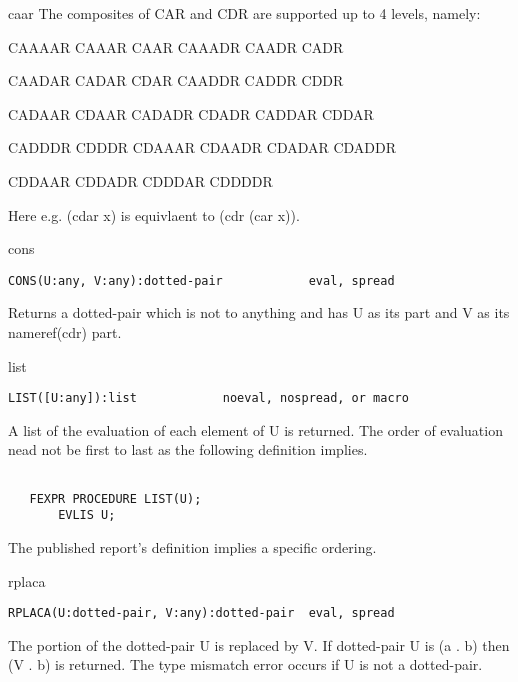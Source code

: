\begin{Function}{caar}
The composites of CAR and CDR are supported up to 4 levels, namely:

CAAAAR  CAAAR  CAAR CAAADR  CAADR  CADR

CAADAR  CADAR  CDAR CAADDR  CADDR  CDDR

CADAAR  CDAAR  CADADR  CDADR CADDAR  CDDAR

CADDDR  CDDDR  CDAAAR CDAADR CDADAR CDADDR

CDDAAR CDDADR CDDDAR CDDDDR

Here e.g. (cdar x) is equivlaent to (cdr (car x)).

\end{Function}
\begin{Function}{cons}
\begin{verbatim}
CONS(U:any, V:any):dotted-pair            eval, spread
\end{verbatim}
   Returns  a dotted-pair which  is not  to  anything and has U
   as its  part and V as its nameref(cdr) part.

\end{Function}
\begin{Function}{list}
\begin{verbatim}
LIST([U:any]):list            noeval, nospread, or macro
\end{verbatim}
   A  list of  the evaluation of  each element of  U is returned.
   The  order  of evaluation  nead not  be first  to last  as the
   following definition implies.
\begin{verbatim}

   FEXPR PROCEDURE LIST(U);
       EVLIS U;
\end{verbatim}
     The   published  report's  definition   implies  a  specific
   ordering.
\end{Function}
\begin{Function}{rplaca}
\begin{verbatim}
RPLACA(U:dotted-pair, V:any):dotted-pair  eval, spread
\end{verbatim}
   The   portion  of the  dotted-pair U  is replaced by  V. If
   dotted-pair U  is (a .  b) then (V . b) is returned.  The type
   mismatch error occurs if U is not a dotted-pair.
\end{Function}
